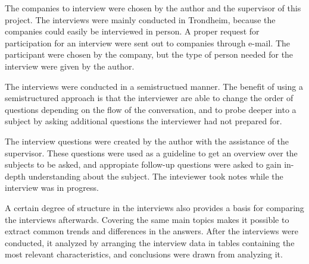 The companies to interview were chosen by the author and the supervisor of this project. The interviews were mainly conducted in Trondheim, because the companies could easily be interviewed in person. A proper request for participation for an interview were sent out to companies through e-mail. The participant were chosen by the company, but the type of person needed for the interview were given by the author.

The interviews were conducted in a semistructued manner. The benefit of using a semistructured approach is that the interviewer are able to change the order of questions depending on the flow of the conversation, and to probe deeper into a subject by asking additional questions the interviewer had not prepared for\cite{Oates:2006:RIS:1202299}. 

The interview questions were created by the author with the assistance of the supervisor. These questions were used as a guideline to get an overview over the subjects to be asked, and appropiate follow-up questions were asked to gain in-depth understanding about the subject. The inteviewer took notes while the interview was in progress. 

A certain degree of structure in the interviews also provides a basis for comparing the interviews afterwards. Covering the same main topics makes it possible to extract common trends and differences in the answers. After the interviews were conducted, it analyzed by arranging the interview data in tables containing the most relevant characteristics, and conclusions were drawn from analyzing it.



